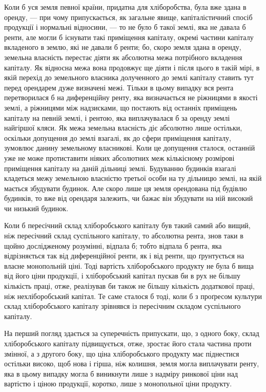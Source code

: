 
Коли б уся земля певної країни, придатна для хліборобства, була вже
здана в оренду, — при чому припускається, як загальне явище, капіталістичний
спосіб продукції і нормальні відносини, — то не було б такої землі, яка не
давала б ренти, але могли б існувати такі приміщення капіталу, окремі частини
капіталу вкладеного в землю, які не давали б ренти; бо, скоро земля здана в
оренду, земельна власність перестає діяти як абсолютна межа потрібного вкладення
капіталу. Як відносна межа вона продовжує ще діяти і після цього
в такій мірі, в якій перехід до земельного власника долученного до землі капіталу
ставить тут перед орендарем дуже визначені межі. Тільки в цьому випадку
вся рента перетворилася б на диференційну ренту, яка
визначається не ріжницями в якості землі, а ріжницями між надзисками, що
постають від останніх приміщень капіталу на певній землі, і рентою, яка виплачувалася
б за оренду землі найгіршої кляси. Як межа земельна власність
діє абсолютно лише остільки, оскільки допущення до землі взагалі, як до сфери
приміщення капіталу, зумовлює данину земельному власникові. Коли це допущення
сталося, останній уже не може протиставити ніяких абсолютних меж
кількісному розмірові приміщення капіталу на даній дільниці землі. Будуванню
будинків взагалі кладеться межу земельною власністю третьої особи на ту дільницю
землі, на якій мається збудувати будинок. Але скоро лише ця земля
орендована під будівлю будинків, то вже від орендаря залежить, чи бажає він
збудувати на ній високий чи низький будинок.

Коли б пересічний склад хліборобського капіталу був такий самий або
вищий, ніж пересічний склад суспільного капіталу, то абсолютна рента, знов
таки в щойно дослідженому розумінні, відпала б; тобто відпала б рента, яка
відрізняється так від диференційної ренти, як і від ренти, що ґрунтується на
власне монопольній ціні. Тоді вартість хліборобського продукту не була б
вища від його ціни продукції, і хліборобський капітал пускав би в рух не
більшу кількість праці, отже, реалізував би також не більшу кількість додаткової
праці, ніж нехліборобський капітал. Те саме сталося б тоді, коли б з
проґресом культури склад хліборобського капіталу зрівнявся із пересічним
складом суспільного капіталу.

На перший погляд здається за суперечність припускати, що, з одного
боку, склад хліборобського капіталу підвищується, отже, зростає його стала частина
проти змінної, а з другого боку, що ціна хліборобського продукту має
піднестися остільки високо, щоб нова і гірша, ніж колишня, земля могла виплачувати
ренту, яка в цьому випадку могла б виникнути лише з надміру ринкової
ціни над вартістю і ціною продукції, коротко, лише з монопольної ціни
продукту.

